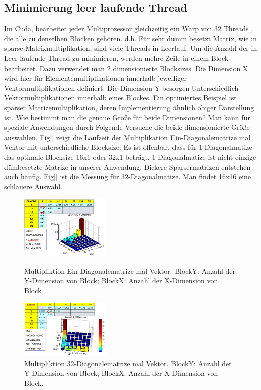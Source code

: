 \subsection{Minimierung leer laufende Thread}

Im Cuda, bearbeitet jeder Multiprozessor gleichzeitig ein Warp von 32 Threads \cite{cudapg}, die alle zu denselben Blöcken gehören. d.h. Für sehr dumm besetzt Matrix, wie in sparse Matrixmultiplikation, sind viele Threads in Leerlauf. Um die Anzahl der in Leer laufende Thread zu minimieren, werden mehre Zeile in einem Block bearbeitet. Dazu verwendet man 2 dimensionierte Blocksizes. Die Dimension X wird hier für Elementemultiplikationen innerhalb jeweiliger Vektormultiplikationen definiert. Die Dimension Y besorgen Unterschiedlich Vektormultiplikationen innerhalb eines Blockes. Ein optimiertes Beispiel ist sparser Matrizemultiplikation, deren Implementierung ähnlich obiger Darstellung ist. Wie bestimmt man die genaue Größe für beide Dimensionen?  Man kann für speziale Anwendungen durch Folgende Versuche die beide dimensionierte Größe auswahlen. Fig[] zeigt die Laufzeit der Multiplikation Ein-Diagonalematrize mal Vektor mit unterschiedliche Blocksize. Es ist offenbar, dass für 1-Diagonalmatize das optimale Blocksize 16x1 oder 32x1 beträgt. 1-Diagonalmatize ist nicht einzige dümbesetzte Matrize in unserer Anwendung. Dickere Sparsermatrizen entstehen auch häufig. Fig[] ist die Messung für 32-Diagonalmatize. Man findet 16x16 eine schlauere Auswahl.


\begin{figure}[htbp]

	\includegraphics[width=1.7in]{.//pic//einDiagonal}
	\caption{Multipliktion Ein-Diagonalematrize mal Vektor. BlockY: Anzahl der Y-Dimension von Block; BlockX: Anzahl der X-Dimension von Block}
	\includegraphics[width=1.7in]{.//pic//moreDiagonal}
	\caption{Multipliktion 32-Diagonalematrize mal Vektor. BlockY: Anzahl der Y-Dimension von Block; BlockX: Anzahl der X-Dimension von Block.}
\end{figure}